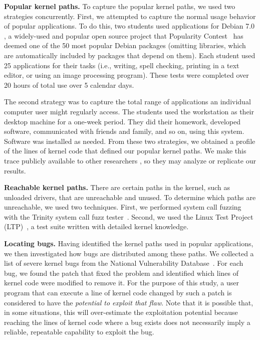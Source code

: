 \noindent
\textbf{Popular kernel paths.}
To capture the popular kernel paths, we used two strategies concurrently.
First, we attempted to capture the normal usage behavior of popular applications.
To do this, two students used applications for Debian 7.0 , a widely-used and popular open source project
that Popularity Contest~\cite{Top-Packages} has deemed one of the 50 most popular Debian
packages (omitting libraries, which are automatically included by packages that
depend on them). Each student used 25 applications for their
tasks (i.e., writing, spell checking, printing in a text editor, or using
an image processing program).
These tests were completed over 20 hours of
total use over 5 calendar days.

The second strategy was to capture the total range of applications an
individual computer user might regularly access. The students used the workstation as their
desktop machine for a one-week period. They did their homework, developed
software, communicated with friends and family, and so on, using this
system.  Software was installed as needed.
%
From these two strategies, we obtained a profile of the lines of
kernel code that defined our popular kernel paths.  We make this trace
publicly available to other researchers \cite{Lind}, so they may analyze or
replicate our results.

\noindent
\textbf{Reachable kernel paths.}
There are certain paths in the kernel, such as unloaded drivers, that are
unreachable and unused.
To determine which paths are unreachable, we used two techniques.  First,
we performed system call fuzzing with the Trinity
system call fuzz tester~\cite{Trinity}.
Second, we used the Linux Test Project (LTP)~\cite{LTP}, a test suite written
with detailed kernel knowledge.
%

\noindent
\textbf{Locating bugs.}
Having identified the kernel paths used in popular applications,
we then investigated how bugs are distributed among these paths. We collected a list of
severe kernel bugs from the National Vulnerability Database~\cite{NVD}.
For each bug, we found the patch that fixed the problem and identified
which lines of kernel code were modified to remove it.
For the purpose of this study, a user program that can execute a line of kernel
code changed by such a patch is considered to have the \textit{potential to
exploit that flaw}.  Note that it is possible that, in some situations,
this will over-estimate the exploitation potential because reaching the lines of kernel code where a
bug exists does not necessarily imply a reliable, repeatable capability to
exploit the bug.

